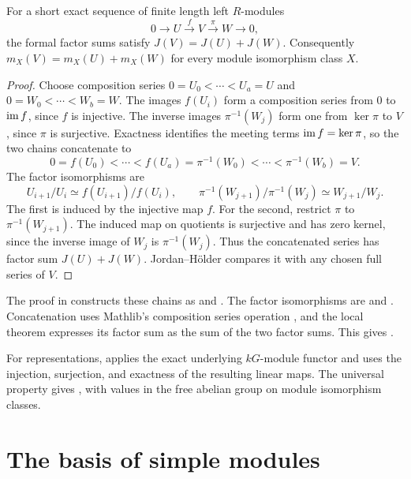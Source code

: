 \begin{proposition}
\label{lib:kzero:factor-additivity}
For a short exact sequence of finite length left $R$-modules
\[
 0\longrightarrow U\xrightarrow{f}V\xrightarrow{\pi}W\longrightarrow0,
\]
the formal factor sums satisfy $J(V)=J(U)+J(W)$. Consequently
$m_X(V)=m_X(U)+m_X(W)$ for every module isomorphism class $X$.
\end{proposition}
\begin{proof}
Choose composition series
$0=U_0<\cdots<U_a=U$ and $0=W_0<\cdots<W_b=W$.
The images $f(U_i)$ form a composition series from $0$ to $\operatorname{im} f$, since
$f$ is injective. The inverse images $\pi^{-1}(W_j)$ form one from
$\ker \pi$ to $V$, since $\pi$ is surjective. Exactness identifies the meeting
terms $\operatorname{im} f=\ker \pi$, so the two chains concatenate to
\[
 0=f(U_0)<\cdots<f(U_a)=\pi^{-1}(W_0)
 <\cdots<\pi^{-1}(W_b)=V.
\]
The factor isomorphisms are
\[
 U_{i+1}/U_i\simeq f(U_{i+1})/f(U_i),
 \qquad
 \pi^{-1}(W_{j+1})/\pi^{-1}(W_j)\simeq W_{j+1}/W_j.
\]
The first is induced by the injective map $f$. For the second,
restrict $\pi$ to $\pi^{-1}(W_{j+1})$. The induced map on quotients is
surjective and has zero kernel, since the inverse image of $W_j$ is
$\pi^{-1}(W_j)$. Thus the concatenated series has
factor sum $J(U)+J(W)$. Jordan--H\"older compares it with any chosen full
series of $V$.
\end{proof}

\begin{implementation}
The proof in  constructs these
chains as  and .
The factor isomorphisms are
 and
. Concatenation uses Mathlib's
composition series operation , and the local theorem
 expresses its factor sum as the sum
of the two factor sums. This gives
.

For representations,  applies the
exact underlying $kG$-module functor and uses the injection, surjection,
and exactness of the resulting linear maps. The universal property gives
, with values in the free abelian group
on module isomorphism classes.
\end{implementation}

\section{The basis of simple modules}
\label{lib:kzero:simple-basis}

